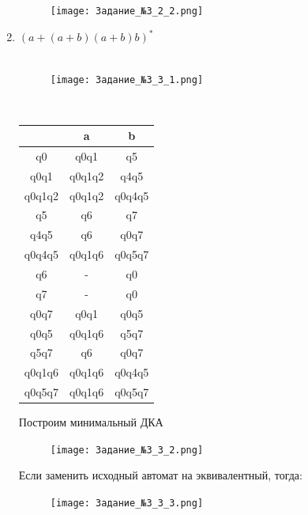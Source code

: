 \documentclass[a4paper]{article}
\begin{document}
\begin{enumerate}
\begin{figure}[h]
\centering
\texttt{[image: Задание\_№3\_2\_2.png]}
\end{figure}

\newpage
\item $(a+(a+b)(a+b)b)^*$\\
\\
\begin{figure}[h]
\centering
\texttt{[image: Задание\_№3\_3\_1.png]}
\end{figure}
\\
\begin{tabular}{|*{3}{c|}}
\textbf{ } & a & b \\
\hline\hline
q0 & q0q1 & q5 \\
\hline\hline
q0q1 & q0q1q2 & q4q5 \\
\hline\hline
q0q1q2 & q0q1q2 & q0q4q5 \\
\hline\hline
q5 & q6 & q7 \\
\hline\hline
q4q5 & q6 & q0q7 \\
\hline\hline
q0q4q5 & q0q1q6 & q0q5q7 \\
\hline\hline
q6 & - & q0 \\
\hline\hline
q7 & - & q0 \\
\hline\hline
q0q7 & q0q1 & q0q5 \\
\hline\hline
q0q5 & q0q1q6 & q5q7 \\
\hline\hline
q5q7 & q6 & q0q7 \\
\hline\hline
q0q1q6 & q0q1q6 & q0q4q5 \\
\hline\hline
q0q5q7 & q0q1q6 & q0q5q7 \\
\end{tabular}
\newpage
Построим минимальный ДКА \\
\begin{figure}[h]
\centering
\texttt{[image: Задание\_№3\_3\_2.png]}
\end{figure}

Если заменить исходный автомат на эквивалентный, тогда:\\
\begin{figure}[h]
\centering
\texttt{[image: Задание\_№3\_3\_3.png]}
\end{figure}


\end{enumerate}
\end{document}
